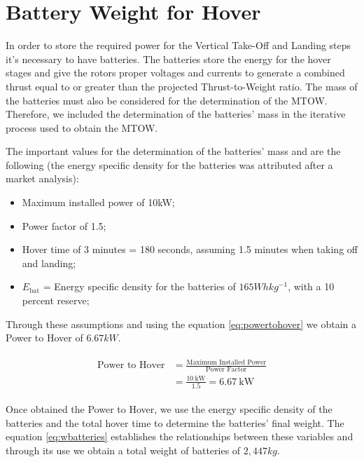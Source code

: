 \documentclass[english,fira]{ist-report}
\begin{document}
\chapter{Battery Weight for Hover} \label{chap:bathover}
In order to store the required power for the Vertical Take-Off and Landing steps it’s necessary to have batteries. The batteries store the energy for the hover stages and give the rotors proper voltages and currents to generate a combined thrust equal to or greater than the projected Thrust-to-Weight ratio. The mass of the batteries must also be considered for the determination of the MTOW. Therefore, we included the determination of the batteries’ mass in the iterative process used to obtain the MTOW.\par
The important values for the determination of the batteries’ mass and are the following (the energy specific density for the batteries was attributed after a market analysis):
\begin{itemize}
    \item Maximum installed power of 10kW;
    \item Power factor of 1.5;
    \item Hover time of 3 minutes = 180 seconds, assuming 1.5 minutes when taking off and landing;
    \item $E_{\text{bat}}$ = Energy specific density for the batteries of $165Wh kg^{-1}$, with a 10 percent reserve;
\end{itemize}
Through these assumptions and using the equation \ref{eq:powertohover} we obtain a Power to Hover of $6.67kW$.


\begin{gather}\label{eq:powetohover}
    \begin{aligned}
        \text{Power to Hover} &= \frac{\text{Maximum Installed Power}}{\text{Power Factor}} \\
        &= \frac{\SI{10}{\kilo\watt}}{1.5} = \SI{6.67}{\kilo\watt}
    \end{aligned}
\end{gather}

Once obtained the Power to Hover, we use the energy specific density of the batteries and the total hover time to determine the batteries’ final weight. The equation \ref{eq:wbatteries} establishes the relationships between these variables and through its use we obtain a total weight of batteries of $2,447 kg$.
\end{document}

